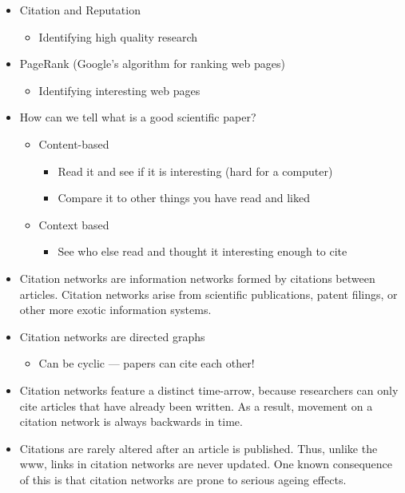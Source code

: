 \documentclass[a4paper,landscape,headrule,footrule,xetex]{foils}
\begin{document}

\begin{itemize}
\item Citation and Reputation
  \begin{itemize}
  \item Identifying high quality research
  \end{itemize}
\item PageRank (Google's algorithm for ranking web pages)
  \begin{itemize}
  \item Identifying interesting web pages
  \end{itemize}
\end{itemize}


\begin{itemize}
\item How can we tell what is a good scientific paper?
  \begin{itemize}
    \item Content-based
    \begin{itemize}
    \item Read it and see if it is interesting (hard for a computer)
    \item Compare it to other things you have read and liked
    \end{itemize}
  \item     Context based 
    \begin{itemize}
    \item See who else read and thought it interesting enough to cite
    \end{itemize}
  \end{itemize}
\end{itemize}

\begin{itemize}
\item Citation networks are information networks formed by citations
  between articles. Citation networks arise from scientific
  publications, patent filings, or other more exotic information
  systems.
\item Citation networks are directed graphs
  \begin{itemize}
  \item Can be cyclic --- papers can cite each other!
  \end{itemize}

\item Citation networks feature a distinct time-arrow, because researchers can only cite articles that have already been written. As a result, movement on a citation network is always backwards in time.

\item Citations are rarely altered after an article is published. Thus, unlike the www, links in citation networks are never updated. One known consequence of this is that citation networks are prone to serious ageing effects.
\end{itemize}
\end{document}
